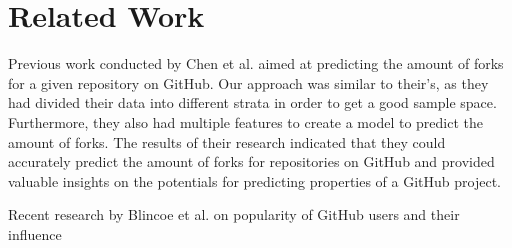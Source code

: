 \section{Related Work}
Previous work conducted by Chen et al.\cite{chen-2014} aimed at predicting the amount of forks for a given repository on GitHub.
Our approach was similar to their's, as they had divided their data into different strata in order to get a good sample space.
Furthermore, they also had multiple features to create a model to predict the amount of forks.
The results of their research indicated that they could accurately predict the amount of forks for repositories on GitHub and provided valuable insights on the potentials for predicting properties of a GitHub project.

Recent research by Blincoe et al.\cite{blincoe-2015} on popularity of GitHub users and their influence 
